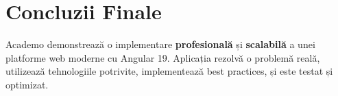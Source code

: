 \section{Concluzii Finale}

Academo demonstrează o implementare \textbf{profesională} și \textbf{scalabilă} a unei platforme web moderne cu Angular 19. Aplicația rezolvă o problemă reală, utilizează tehnologiile potrivite, implementează best practices, și este testat și optimizat.
